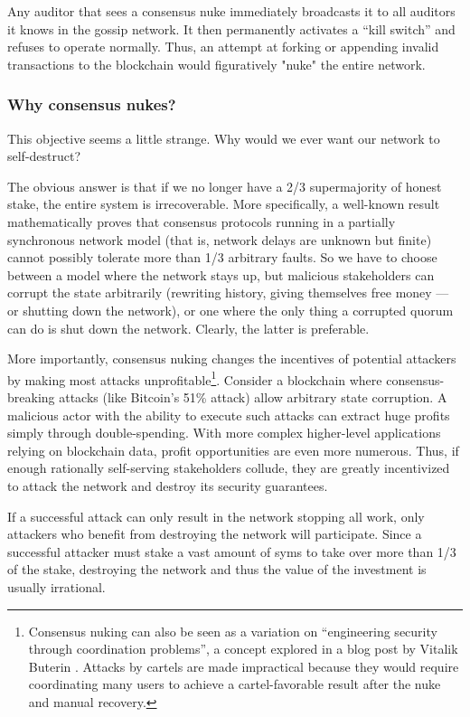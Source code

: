 \documentclass[headinclude,12pt]{scrbook}
\begin{document}
Any auditor that sees a consensus nuke immediately broadcasts it to all auditors it knows in the gossip network. It then permanently activates a ``kill switch'' and refuses to operate normally. Thus, an attempt at forking or appending invalid transactions to the blockchain would figuratively "nuke" the entire network.

\subsubsection{Why consensus nukes?}

This objective seems a little strange. Why would we ever want our network to self-destruct?

The obvious answer is that if we no longer have a 2/3 supermajority of honest stake, the entire system is irrecoverable. More specifically, a well-known result \cite{dwork1988consensus} mathematically proves that consensus protocols running in a partially synchronous network model (that is, network delays are unknown but finite) cannot possibly tolerate more than 1/3 arbitrary faults. So we have to choose between a model where the network stays up, but malicious stakeholders can corrupt the state arbitrarily (rewriting history, giving themselves free money --- or shutting down the network), or one where the only thing a corrupted quorum can do is shut down the network. Clearly, the latter is preferable.

More importantly, consensus nuking changes the incentives of potential attackers by making most attacks unprofitable\footnote{Consensus nuking can also be seen as a variation on ``engineering security through coordination problems'', a concept explored in a blog post by Vitalik Buterin \cite{buterin2017coordination}. Attacks by cartels are made impractical because they would require coordinating many users to achieve a cartel-favorable result after the nuke and manual recovery.}. Consider a blockchain where consensus-breaking attacks (like Bitcoin's 51\% attack) allow arbitrary state corruption. A malicious actor with the ability to execute such attacks can extract huge profits simply through double-spending. With more complex higher-level applications relying on blockchain data, profit opportunities are even more numerous. Thus, if enough rationally self-serving stakeholders collude, they are greatly incentivized to attack the network and destroy its security guarantees.

If a successful attack can only result in the network stopping all work, only attackers who benefit from destroying the network will participate. Since a successful attacker must stake a vast amount of syms to take over more than 1/3 of the stake, destroying the network and thus the value of the investment is usually irrational.
\end{document}
